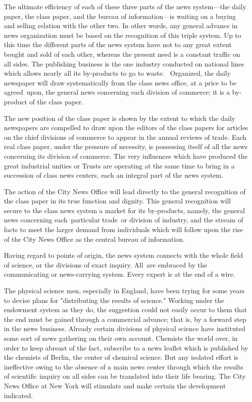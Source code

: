 \documentclass[twoside,symmetric,nobib,justified]{tufte-book}
\begin{document}
The ultimate efficiency of each of these three parts of the news
system---the daily paper, the class paper, and the bureau of
information---is waiting on a buying and selling relation with the other
two. In other words, any general advance in news organization must be
based on the recognition of this triple system. Up to this time the
different parts of the news system have not to any great extent bought
and sold of each other, whereas the present need is a constant traffic
on all sides. The publishing business is the one industry conducted on
national lines which allows nearly all its by-products to go to waste.~
Organized, the daily newspaper will draw systematically from the class
news office, at a price to be agreed~upon, the general news concerning
each division of commerce; it is a by-product of the class paper.~

The new position of the class paper is shown by the extent to which the
daily newspapers are compelled to draw upon the editors of the class
papers for articles on the chief divisions of commerce to appear in the
annual reviews of trade. Each real class paper, under the pressure of
necessity, is possessing itself of all the news concerning its division
of commerce. The very influences which have produced the great
industrial unities or Trusts are operating at the same time to bring in
a succession of class news centers, each an integral part of the news
system.~

The action of the City News Office will lead directly to the general
recognition of the class paper in its true function and dignity. This
general recognition will secure to the class news system a market for
its by-products, namely, the general news concerning each~particular
trade~or division of industry, and the stream of facts to meet the
larger demand from individuals which will follow upon the rise of the
City News Office as the central bureau of information.~

Having regard to points of origin, the news system connects with the
whole field of science, or the divisions of exact inquiry. All~are
embraced by the communicating or news-carrying system. Every expert is
at the end of a wire.~

The physical science men, especially in England, have been trying for
some years to devise plans for "distributing the results of science."
Working under the endowment system as they do, the suggestion could not
easily occur to them that the end must be gained through a commercial
advance; that is, by a forward step in the news business. Already
certain divisions of physical science have instituted some sort of news
gathering on their own account. Chemists the world over, in order to
keep abreast of the fact, subscribe to a news leaflet which is published
by the chemists of Berlin, the center of chemical science. But any
isolated effort is ineffective owing to the absence of a main news
center through which the results of scientific inquiry on all sides can
be translated into their life bearing. The City News Office at New York
will stimulate and make certain the development indicated.~
\end{document}
